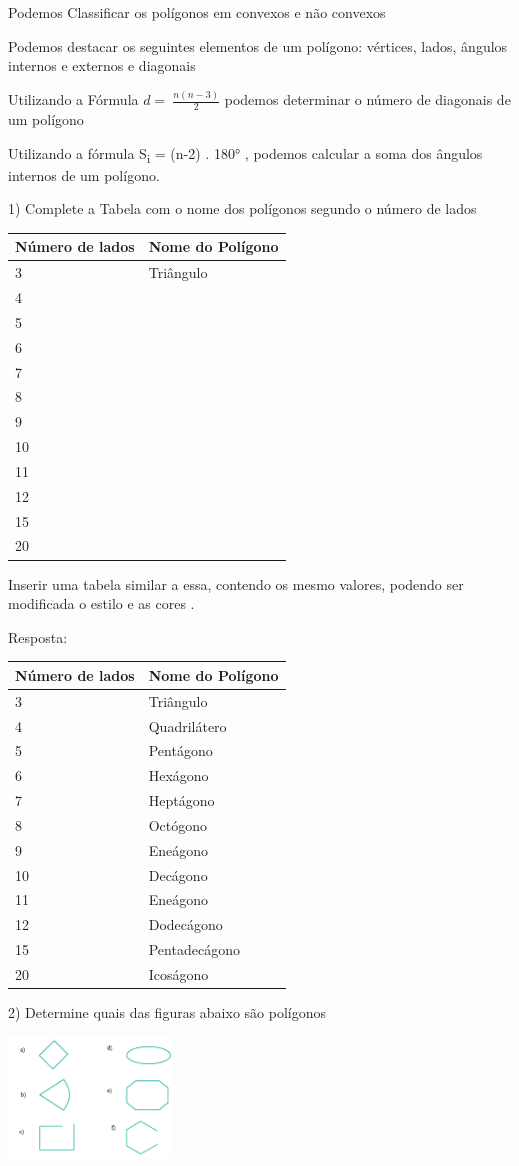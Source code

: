 Podemos Classificar os polígonos em convexos e não convexos

Podemos destacar os seguintes elementos de um polígono: vértices, lados,
ângulos internos e externos e diagonais

Utilizando a Fórmula \(d = \ \frac{n(n - 3)}{2}\) podemos determinar o
número de diagonais de um polígono

Utilizando a fórmula S\textsubscript{i} = (n-2) . 180° , podemos
calcular a soma dos ângulos internos de um polígono.


1) Complete a Tabela com o nome dos polígonos segundo o número de lados

\begin{longtable}[]{@{}ll@{}}
\toprule
Número de lados & Nome do Polígono\tabularnewline
\midrule
\endhead
3 & Triângulo\tabularnewline
4 & ~\tabularnewline
5 & ~\tabularnewline
6 & ~\tabularnewline
7 & ~\tabularnewline
8 & ~\tabularnewline
9 & ~\tabularnewline
10 & ~\tabularnewline
11 & ~\tabularnewline
12 & ~\tabularnewline
15 & ~\tabularnewline
20 & ~\tabularnewline
\bottomrule
\end{longtable}

Inserir uma tabela similar a essa, contendo os mesmo valores, podendo
ser modificada o estilo e as cores .

Resposta:

\begin{longtable}[]{@{}ll@{}}
\toprule
Número de lados & Nome do Polígono\tabularnewline
\midrule
\endhead
3 & Triângulo\tabularnewline
4 & Quadrilátero\tabularnewline
5 & Pentágono\tabularnewline
6 & Hexágono\tabularnewline
7 & Heptágono\tabularnewline
8 & Octógono\tabularnewline
9 & Eneágono\tabularnewline
10 & Decágono\tabularnewline
11 & Eneágono\tabularnewline
12 & Dodecágono\tabularnewline
15 & Pentadecágono\tabularnewline
20 & Icoságono\tabularnewline
\bottomrule
\end{longtable}

2) Determine quais das figuras abaixo são polígonos

\includegraphics[width=1.7in,height=1.26763in]{./imgSAEB_8_MAT/media/image7.png}

